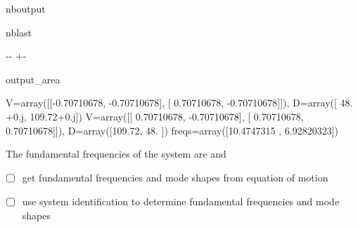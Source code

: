 \documentclass[letterpaper,10pt,english]{sphinxmanual}
\begin{document}
\begin{sphinxuseclass}{nboutput}
\begin{sphinxuseclass}{nblast}
{

\kern-\sphinxverbatimsmallskipamount\kern-\baselineskip
\kern+\FrameHeightAdjust\kern-\fboxrule
\vspace{\nbsphinxcodecellspacing}

\begin{sphinxuseclass}{output_area}
\begin{sphinxuseclass}{}


\begin{sphinxVerbatim}[commandchars=\\\{\}]
V=array([[-0.70710678, -0.70710678],
       [ 0.70710678, -0.70710678]]),
D=array([ 48.  +0.j, 109.72+0.j])
V=array([[ 0.70710678, -0.70710678],
       [ 0.70710678,  0.70710678]]),
D=array([109.72,  48.  ])
freqs=array([10.4747315 ,  6.92820323])
\end{sphinxVerbatim}



\end{sphinxuseclass}
\end{sphinxuseclass}
}

\end{sphinxuseclass}
\end{sphinxuseclass}
\sphinxAtStartPar
The fundamental frequencies of the system are  and 
\begin{itemize}
\item {} 
\sphinxAtStartPar
☐ get fundamental frequencies and mode shapes from equation of motion

\item {} 
\sphinxAtStartPar
☐ use system identification to determine fundamental frequencies and mode shapes

\end{itemize}
\end{document}
